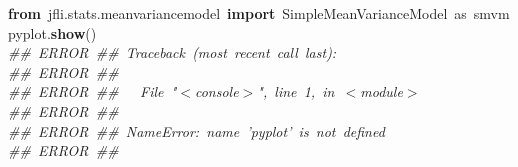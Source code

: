 \noindent
\mbox{}\textbf{from}\ jfli.stats.meanvariancemodel\ \textbf{import}\ SimpleMeanVarianceModel\ as\ smvm \\
\mbox{}pyplot.\textbf{show}() \\
\mbox{}\textit{\#\#\ ERROR\ \#\#\ Traceback\ (most\ recent\ call\ last):} \\
\mbox{}\textit{\#\#\ ERROR\ \#\#\ } \\
\mbox{}\textit{\#\#\ ERROR\ \#\#\ \ \ File\ "{}$<$console$>$"{},\ line\ 1,\ in\ $<$module$>$} \\
\mbox{}\textit{\#\#\ ERROR\ \#\#\ } \\
\mbox{}\textit{\#\#\ ERROR\ \#\#\ NameError:\ name\ 'pyplot'\ is\ not\ defined} \\
\mbox{}\textit{\#\#\ ERROR\ \#\#\ } \\
\mbox{} \\
\mbox{}